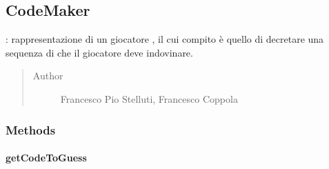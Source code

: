 \documentclass[letterpaper,10pt,italian,openany,oneside]{sphinxmanual}
\begin{document}
\subsection{CodeMaker}
\label{\detokenize{source/it/unicam/cs/pa/mastermind/players/CodeMaker:codemaker}}\label{\detokenize{source/it/unicam/cs/pa/mastermind/players/CodeMaker::doc}}

\begin{fulllineitems}
\label{\detokenize{source/it/unicam/cs/pa/mastermind/players/CodeMaker:it.unicam.cs.pa.mastermind.players.CodeMaker}}
: rappresentazione di un giocatore , il cui compito è quello di decretare una sequenza di  che il giocatore  deve indovinare.
\begin{quote}\begin{description}
\item[{Author}] \leavevmode
Francesco Pio Stelluti, Francesco Coppola

\end{description}\end{quote}

\end{fulllineitems}



\subsubsection{Methods}
\label{\detokenize{source/it/unicam/cs/pa/mastermind/players/CodeMaker:methods}}

\paragraph{getCodeToGuess}
\label{\detokenize{source/it/unicam/cs/pa/mastermind/players/CodeMaker:getcodetoguess}}
\end{document}
